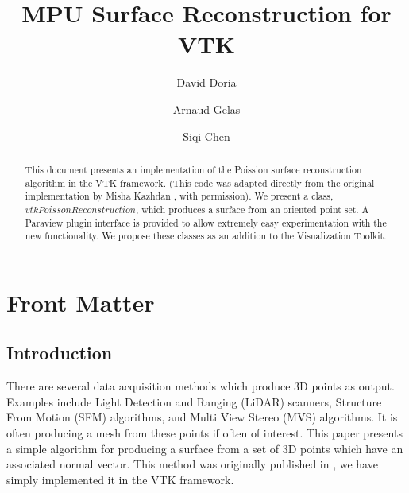 \documentclass{InsightArticle}
\title{MPU Surface Reconstruction for VTK}
\author{David Doria \and Arnaud Gelas \and Siqi Chen}
\newcommand{\IJhandlerIDnumber}{3149}
\begin{document}
%
% 
\IJhandlefooter{\IJhandlerIDnumber}


\ifpdf
\else
\fi


\maketitle


\ifhtml
\chapter*{Front Matter\label{front}}
\fi


\begin{abstract}
\noindent
This document presents an implementation of the Poission surface reconstruction algorithm in the VTK framework. (This code was adapted directly from the original implementation by Misha Kazhdan \cite{reconstruction}, with permission). We present a class, $vtkPoissonReconstruction$, which produces a surface from an oriented point set. A Paraview plugin interface is provided to allow extremely easy experimentation with the new functionality. We propose these classes as an addition to the Visualization Toolkit.

\end{abstract}

\IJhandlenote{\IJhandlerIDnumber}

\tableofcontents

\section{Introduction}
There are several data acquisition methods which produce 3D points as output. Examples include Light Detection and Ranging (LiDAR) scanners, Structure From Motion (SFM) algorithms, and Multi View Stereo (MVS) algorithms. It is often producing a mesh from these points if often of interest. This paper presents a simple algorithm for producing a surface from a set of 3D points which have an associated normal vector. This method was originally published in \cite{reconstruction}, we have simply implemented it in the VTK framework.
\end{document}
